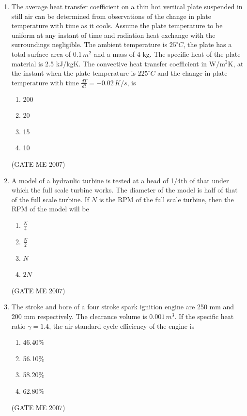 \documentclass[journal]{IEEEtran}
\begin{document}
\begin{enumerate}
\item The average heat transfer coefficient on a thin hot vertical plate suspended in still air can be determined from observations of the change in plate temperature with time as it cools. Assume the plate temperature to be uniform at any instant of time and radiation heat exchange with the surroundings negligible. The ambient temperature is $ 25^\circ C $, the plate has a total surface area of $ 0.1 \, m^2 $ and a mass of 4 kg. The specific heat of the plate material is 2.5 kJ/kgK. The convective heat transfer coefficient in W/m$^2$K, at the instant when the plate temperature is $ 225^\circ C $ and the change in plate temperature with time $ \frac{dT}{dt} = -0.02 \, K/s $, is
\begin{multicols}{4}
\begin{enumerate}
\item 200
\item 20
\item 15
\item 10
\end{enumerate}
\end{multicols}
\hfill (GATE ME 2007)

\item A model of a hydraulic turbine is tested at a head of 1/4th of that under which the full scale turbine works. The diameter of the model is half of that of the full scale turbine. If $ N $ is the RPM of the full scale turbine, then the RPM of the model will be
\begin{multicols}{4}
\begin{enumerate}
\item $ \frac{N}{4} $
\item $ \frac{N}{2} $
\item $ N $
\item $ 2N $
\end{enumerate}
\end{multicols}
\hfill (GATE ME 2007)

\item The stroke and bore of a four stroke spark ignition engine are 250 mm and 200 mm respectively. The clearance volume is $ 0.001 \, m^3 $. If the specific heat ratio $ \gamma = 1.4 $, the air-standard cycle efficiency of the engine is
\begin{multicols}{4}
\begin{enumerate}
\item 46.40\%
\item 56.10\%
\item 58.20\%
\item 62.80\%
\end{enumerate}
\end{multicols}
\hfill (GATE ME 2007)


\end{enumerate}
\end{document}
